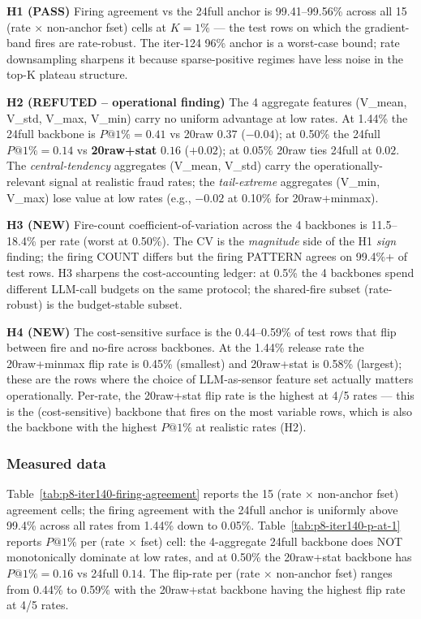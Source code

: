 \documentclass{article}
\begin{document}
\textbf{H1 (PASS)} Firing agreement vs the 24full anchor is 99.41--99.56\%
across all 15 (rate $\times$ non-anchor fset) cells at $K{=}1\%$ ---
the test rows on which the gradient-band fires are rate-robust.  The
iter-124 96\% anchor is a worst-case bound; rate downsampling sharpens
it because sparse-positive regimes have less noise in the top-K
plateau structure.

\textbf{H2 (REFUTED -- operational finding)} The 4 aggregate
features (V\_mean, V\_std, V\_max, V\_min) carry no uniform
advantage at low rates.  At 1.44\% the 24full backbone is
$P@1\%{=}0.41$ vs 20raw $0.37$ ($-0.04$); at 0.50\% the 24full
$P@1\%{=}0.14$ vs \textbf{20raw+stat} $0.16$ ($+0.02$); at 0.05\%
20raw ties 24full at $0.02$.  The \textit{central-tendency} aggregates
(V\_mean, V\_std) carry the operationally-relevant signal at realistic
fraud rates; the \textit{tail-extreme} aggregates (V\_min, V\_max)
lose value at low rates (e.g., $-0.02$ at 0.10\% for 20raw+minmax).

\textbf{H3 (NEW)} Fire-count coefficient-of-variation across the 4
backbones is 11.5--18.4\% per rate (worst at 0.50\%).  The CV is the
\emph{magnitude} side of the H1 \emph{sign} finding; the firing
COUNT differs but the firing PATTERN agrees on 99.4\%+ of test rows.
H3 sharpens the cost-accounting ledger: at 0.5\% the 4 backbones
spend different LLM-call budgets on the same protocol; the
shared-fire subset (rate-robust) is the budget-stable subset.

\textbf{H4 (NEW)} The cost-sensitive surface is the 0.44--0.59\%
of test rows that flip between fire and no-fire across backbones.
At the 1.44\% release rate the 20raw+minmax flip rate is 0.45\%
(smallest) and 20raw+stat is 0.58\% (largest); these are the rows
where the choice of LLM-as-sensor feature set actually matters
operationally.  Per-rate, the 20raw+stat flip rate is the
highest at 4/5 rates --- this is the (cost-sensitive) backbone
that fires on the most variable rows, which is also the
backbone with the highest $P@1\%$ at realistic rates (H2).

\subsubsection{Measured data}
Table~\ref{tab:p8-iter140-firing-agreement} reports the 15
(rate $\times$ non-anchor fset) agreement cells; the firing
agreement with the 24full anchor is uniformly above 99.4\%
across all rates from 1.44\% down to 0.05\%.  Table~\ref{tab:p8-iter140-p-at-1}
reports $P@1\%$ per (rate $\times$ fset) cell: the 4-aggregate
24full backbone does NOT monotonically dominate at low rates,
and at 0.50\% the 20raw+stat backbone has $P@1\%{=}0.16$ vs
24full $0.14$.  The flip-rate per (rate $\times$ non-anchor fset)
ranges from 0.44\% to 0.59\% with the 20raw+stat backbone having
the highest flip rate at 4/5 rates.
\end{document}
